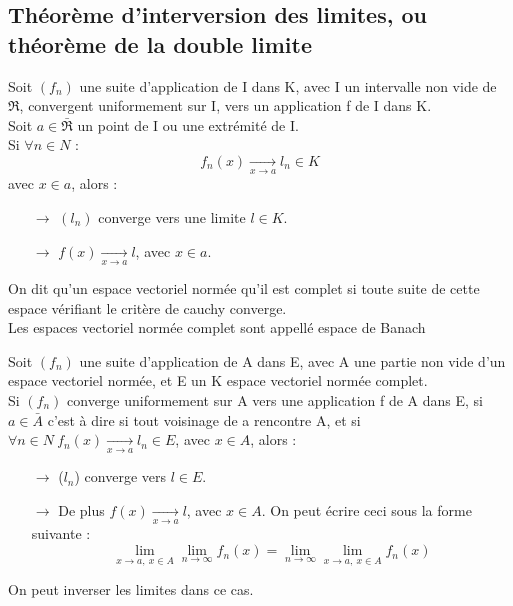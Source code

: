 \subsection{Théorème d'interversion des limites, ou théorème de la double limite}
\begin{theo}
Soit $(f_n)$ une suite d'application de I dans K, avec I un intervalle non vide de $\Re$, convergent uniformement sur I, vers un application f de I dans K.\\
Soit $a \in \bar{\Re}$ un point de I ou une extrémité de I.\\
Si $\forall n \in N$ :
$$f_n(x) \underset{x \rightarrow a}\rightarrow l_n \in K$$
avec $x \in a$, alors : \\
\begin{itemize}
 \item[$\rightarrow$] $(l_n)$ converge vers une limite $l \in K$.\\
 \item[$\rightarrow$] $f(x) \underset{x \rightarrow a}\rightarrow l$, avec $x \in a$.\\
\end{itemize}
\end{theo}
\begin{de}
On dit qu'un espace vectoriel normée qu'il est complet si toute suite de cette espace vérifiant le critère de cauchy converge.\\
Les espaces vectoriel normée complet sont appellé espace de Banach
\end{de}
\begin{gene}
Soit $(f_n)$ une suite d'application de A dans E, avec A une partie non vide d'un espace vectoriel normée, et E un K espace vectoriel normée complet.\\
Si $(f_n)$ converge uniformement sur A vers une application f de A dans E, si $a \in \bar{A}$ c'est à dire si tout voisinage de a rencontre A, et si $\forall n \in N~ f_n(x) \underset{x \rightarrow a}\rightarrow l_n \in E$, avec $x \in A$, alors : \\
\begin{itemize}
 \item[$\rightarrow$] ($l_n$) converge vers $l \in E$.\\
 \item[$\rightarrow$] De plus $f(x) \underset{x \rightarrow a}\rightarrow l$, avec $x \in A$. On peut écrire ceci sous la forme suivante :  
$$\lim_{x \rightarrow a,~ x \in A} \lim_{n\rightarrow \infty} f_n(x) = \lim_{n\rightarrow \infty} \lim_{x \rightarrow a,~ x \in A} f_n(x)$$
\end{itemize}
On peut inverser les limites dans ce cas.
\end{gene}
